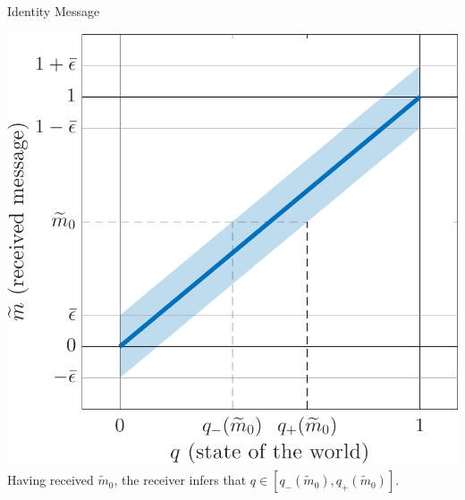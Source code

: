 \documentclass[hyperref={colorlinks=true,linkcolor=blue,citecolor=blue}]{beamer}
\begin{document}
\begin{frame}{Identity Message}
\begin{center}
\includegraphics[scale=.45]{IdentityMessagePlot}\\
Having received $\widetilde{m}_{0}$, the receiver infers that $q\in[q_{-}(\widetilde{m}_{0}),q_{+}(\widetilde{m}_{0})]$. 
\end{center}
\end{frame}
\end{document}
